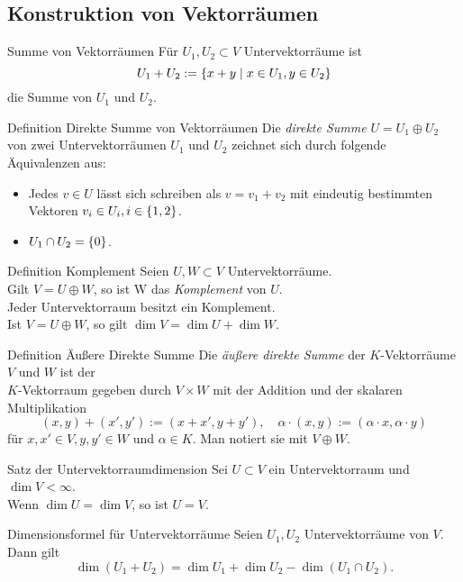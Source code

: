 \documentclass[main.tex]{subfiles}
\begin{document}
\subsection*{Konstruktion von Vektorräumen}
\begin{karte}{Summe von Vektorräumen}
    Für \(U_1, U_2 \subset V\) Untervektorräume ist 
    \[U_1 + U_2 := \{x + y \;\vert \; x \in U_1, y \in U_2\}\]
    die Summe von \(U_1\) und \(U_2\).
\end{karte}
\begin{karte}{Definition Direkte Summe von Vektorräumen}
    Die \textit{direkte Summe} \(U = U_1 \oplus U_2\) von zwei 
    Untervektorräumen \(U_1\) und \(U_2\) zeichnet sich durch 
    folgende Äquivalenzen aus: 
    \begin{itemize}
        \item Jedes \(v \in U\) lässt sich schreiben als 
        \(v = v_1 + v_2\) mit eindeutig bestimmten Vektoren
        \(v_i \in U_i, i \in \{1,2\}\).
        \item \(U_1 \cap U_2 = \{0\}\).
    \end{itemize}
\end{karte}
\begin{karte}{Definition Komplement}
    Seien \(U,W \subset V\) Untervektorräume.\\
    Gilt \(V = U \oplus W\), so ist W das \textit{Komplement} von \(U\). \\
    Jeder Untervektorraum besitzt ein Komplement.\\
    Ist \( V = U \oplus W \), so gilt \( \dim V = \dim U + \dim W \).
\end{karte}
\begin{karte}{Definition Äußere Direkte Summe}
    Die \textit{äußere direkte Summe} der \(K\)-Vektorräume \(V\) 
    und \(W\) ist der\\
    \(K\)-Vektorraum gegeben durch \( V \times W \) 
    mit der Addition und der skalaren Multiplikation 
    \[ (x,y) + (x',y') := (x + x', y + y'), \quad 
    \alpha \cdot (x,y) := (\alpha \cdot x, \alpha \cdot y) \]
    für \( x,x' \in V, y,y' \in W \) und \( \alpha \in K \). 
    Man notiert sie mit \( V \oplus W \).
\end{karte}
\begin{karte}{Satz der Untervektorraumdimension}
    Sei \( U \subset V \) ein Untervektorraum und \( \dim V < \infty \). \\
    Wenn \( \dim U = \dim V \), so ist \( U = V \).
\end{karte}
\begin{karte}{Dimensionsformel für Untervektorräume}
    Seien \( U_1, U_2 \) Untervektorräume von \(V\). Dann gilt 
    \[ \dim(U_1 + U_2) = \dim U_1 + \dim U_2 - \dim(U_1 \cap U_2). \]
\end{karte}
\end{document}
